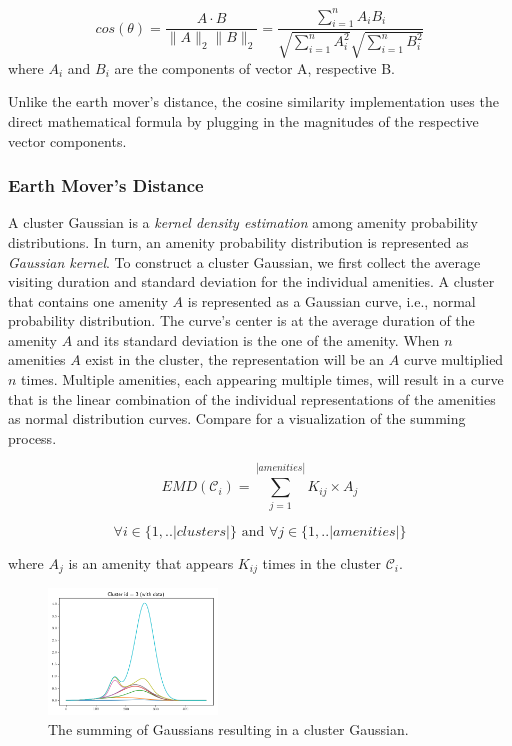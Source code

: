 \begin{equation}
cos(\theta)=\frac{A\cdot B}{{\lVert}A{\rVert}       
_2{\lVert}B{\rVert}_2}=\frac{\sum_{i=1}^n{A_iB_i}}{\sqrt{\sum_{i=1}^n{A_i^2}}\sqrt{\sum_{i=1}^n{B_i^2}}}
\end{equation}
where $A_i$ and $B_i$ are the components of vector A, respective B. 

Unlike the earth mover's distance, the cosine similarity implementation uses the direct mathematical formula by plugging in the magnitudes of the respective vector components.

\subsubsection{Earth Mover's Distance}
\label{realization:gaussians}

A cluster Gaussian is a \textit{kernel density estimation} among amenity probability distributions.
In turn, an amenity probability distribution is represented as \textit{Gaussian kernel}.
To construct a cluster Gaussian, we first collect the average visiting duration and standard deviation for the individual amenities.
A cluster that contains one amenity $A$ is represented as a Gaussian curve, i.e., normal probability distribution.
The curve's center is at the average duration of the amenity $A$ and its standard deviation is the one of the amenity.
When $n$ amenities $A$ exist in the cluster, the representation will be an $A$ curve multiplied $n$ times.
Multiple amenities, each appearing multiple times, will result in a curve that is the linear combination of the individual representations of the amenities as normal distribution curves.
Compare  for a visualization of the summing process.

\begin{equation}
EMD(\mathcal{C}_i) = \sum_{j=1}^{|amenities|} K_{ij} \times A_j
\end{equation}

$$\forall i \in \{1,..|clusters|\} \text{ and } \forall j \in \{1,..|amenities|\}$$

where $A_j$ is an amenity that appears $K_{ij}$ times in the cluster $\mathcal{C}_i$.

\begin{figure}[!ht]
	\centering
	\includegraphics[width=0.4\textwidth]{graphics/emd_gaussian_addition3.png}
	\caption{The summing of Gaussians resulting in a cluster Gaussian.}
	\label{fig:gaussian}
\end{figure}

